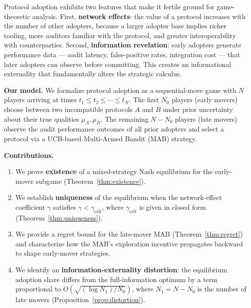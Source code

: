 \documentclass[12pt,a4paper]{article}
\begin{document}
Protocol adoption exhibits two features that make it fertile ground for
game-theoretic analysis.  First, \textbf{network effects}: the value of a
protocol increases with the number of other adopters, because a larger
adopter base implies richer tooling, more auditors familiar with the
protocol, and greater interoperability with counterparties.
Second, \textbf{information revelation}: early adopters generate performance
data — audit latency, false-positive rates, integration cost — that later
adopters can observe before committing.  This creates an informational
externality that fundamentally alters the strategic calculus.

\medskip\noindent
\textbf{Our model.}
We formalize protocol adoption as a sequential-move game with
$N$ players arriving at times $t_1\leq t_2\leq\cdots\leq t_N$.
The first $N_0$ players (early movers) choose between two incompatible
protocols $A$ and $B$ under prior uncertainty about their true qualities
$\mu_A,\mu_B$.  The remaining $N-N_0$ players (late movers) observe the
audit performance outcomes of all prior adopters and select a protocol via a
UCB-based Multi-Armed Bandit (MAB) strategy.

\medskip\noindent
\textbf{Contributions.}
\begin{enumerate}[label=(\arabic*)]
    \item We prove \textbf{existence} of a mixed-strategy Nash equilibrium
          for the early-mover subgame (Theorem~\ref{thm:existence}).
    \item We establish \textbf{uniqueness} of the equilibrium when the
          network-effect coefficient $\gamma$ satisfies
          $\gamma<\gamma_{\text{crit}}$, where $\gamma_{\text{crit}}$ is
          given in closed form (Theorem~\ref{thm:uniqueness}).
    \item We provide a regret bound for the late-mover MAB
          (Theorem~\ref{thm:regret}) and characterize how the MAB's
          exploration incentive propagates backward to shape early-mover
          strategies.
    \item We identify an \textbf{information-externality distortion}: the
          equilibrium adoption share differs from the full-information
          optimum by a term proportional to
          $O(\sqrt{(\log N_1)/N_0})$, where $N_1=N-N_0$ is the number of
          late movers (Proposition~\ref{prop:distortion}).
\end{enumerate}

\end{document}
